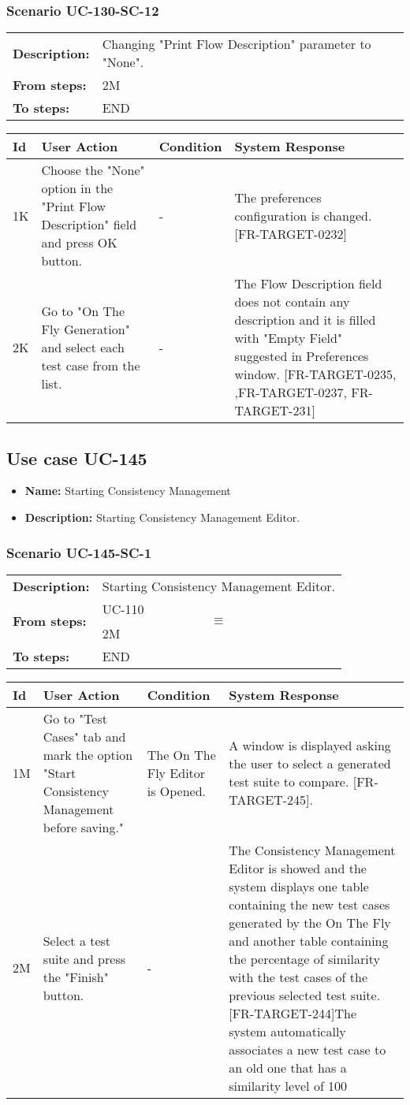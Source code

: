\documentclass[a4paper,11pt]{article}
\newcommand{\bl}{\\ \hline}
\begin{document}
\subsubsection*{Scenario UC-130-SC-12}
\begin{tabular}{p{1in}p{4in}}
{\bf Description:} & Changing "Print Flow Description" parameter to "None". \\
{\bf From steps:} & 2M \\
{\bf To steps:} & END \\
\end{tabular}
 
\begin{tabular}{|p{0.8in}|p{1.6in}|p{1.6in}|p{1.6in}|}
\hline
Id & User Action & Condition & System Response  \bl 
1K & Choose the "None" option in the "Print Flow Description" field and press OK button. & - & The preferences configuration is changed. [FR-TARGET-0232] \bl 
2K & Go to "On The Fly Generation" and select each test case from the list. & - & The Flow Description field does not contain any description and it is filled with "Empty Field" suggested in Preferences window. [FR-TARGET-0235, ,FR-TARGET-0237, FR-TARGET-231] \bl 
\end{tabular}
\subsection*{Use case UC-145}
\begin{itemize}
\item {\bf Name: }Starting Consistency Management
\item {\bf Description: }Starting Consistency Management Editor.
\end{itemize}
\subsubsection*{Scenario UC-145-SC-1}
\begin{tabular}{p{1in}p{4in}}
{\bf Description:} & Starting Consistency Management Editor. \\
{\bf From steps:} & UC-110$$\equiv$$2M \\
{\bf To steps:} & END \\
\end{tabular}
 
\begin{tabular}{|p{0.8in}|p{1.6in}|p{1.6in}|p{1.6in}|}
\hline
Id & User Action & Condition & System Response  \bl 
1M & Go to "Test Cases" tab and mark the option "Start Consistency Management before saving." & The On The Fly Editor is Opened. & A window is displayed asking the user to select a generated test suite to compare. [FR-TARGET-245]. \bl 
2M & Select a test suite and press the "Finish" button. & - & The Consistency Management Editor is showed and the system displays one table containing the new test cases generated by the On The Fly and another table containing the percentage of similarity with the test cases of the previous selected test suite. [FR-TARGET-244]The system automatically associates a new test case to an old one that has a similarity level of 100%
\end{tabular}
\end{document}

